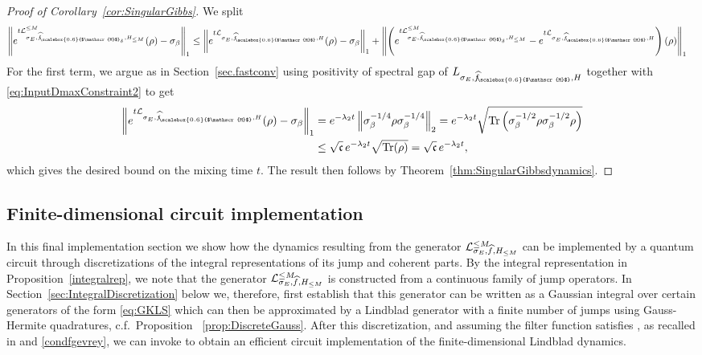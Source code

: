 \documentclass[11pt]{amsart}
\newcommand{\1}{\mathbbm{1}}
\newcommand{\Tr}{\operatorname{Tr}}
\newcommand{\cL}{\mathcal{L}}
\newcommand{\hatfM}{\widehat{f}_{\!\scalebox{0.6}{$\mathscr{M}$}}
}
\newcommand{\hatfMdelta}{\widehat{f}_{\!\scalebox{0.6}{$\mathscr{M}$}_\delta}}
\theoremstyle{plain}
\theoremstyle{definition}
\theoremstyle{remark}
\numberwithin{equation}{section}
\begin{document}
\begin{proof}[Proof of Corollary~\ref{cor:SingularGibbs}]
We split
\begin{align}
\label{eq:MajorTriangle2}
   \left\|e^{t\cL^{\le M}_{\sigma_E,\hatfMdelta,H_{\le M}}}(\rho) - \sigma_\beta\right\|_1  &\le \left\|e^{t\cL_{\sigma_E,\hatfM,H}}(\rho) - \sigma_\beta\right\|_1+\left\|\left(e^{t\cL^{\le M}_{\sigma_E,\hatfMdelta,H_{\le M}}} -e^{t\cL_{\sigma_E,\hatfM,H}}\right)(\rho)\right\|_1  
\end{align}
For the first term, we argue as in Section~\ref{sec.fastconv} using positivity of spectral gap of $L_{\sigma_E,\hatfM,H}$ together with \eqref{eq:InputDmaxConstraint2} to get
\begin{align*} \left\|e^{t\cL_{\sigma_E,\hatfM,H}}(\rho)- \sigma_\beta\right\|_1 &= e^{-\lambda_2 t} \left\|\sigma_\beta^{-1/4}\rho\sigma^{-1/4}_\beta\right\|_2 = e^{-\lambda_2 t} \sqrt{\Tr\left(\sigma^{-1/2}_\beta\rho\sigma^{-1/2}_\beta\rho\right)} \\&\le \sqrt{\mathfrak{c}}\,e^{-\lambda_2 t} \sqrt{\Tr(\rho)}= \sqrt{\mathfrak{c}}\,e^{-\lambda_2 t},
\end{align*}
which gives the desired bound on the mixing time $t.$ The result then follows by Theorem~\ref{thm:SingularGibbsdynamics}.
\end{proof}













\subsection{Finite-dimensional circuit implementation}
\label{sec:FullFiniteDimPipeline}


\noindent In this final implementation section we show how the dynamics resulting from the generator $\cL_{\smash{\sigma_E,\widehat{f},H_{\le M}}}^{\le M}$ can be implemented by a quantum circuit through discretizations of the integral representations of its jump and coherent parts. By the integral representation in Proposition~\ref{integralrep}, we note that the generator $\cL_{\smash{\sigma_E,\widehat{f},H_{\le M}}}^{\le M}$ is constructed from a continuous family of jump operators. In Section~\ref{sec:IntegralDiscretization} below we, therefore, first establish that this generator can be written as a Gaussian integral over certain generators of the form \eqref{eq:GKLS} which can then be approximated by a Lindblad generator with a finite number of jumps using Gauss-Hermite quadratures, c.f.~Proposition ~\ref{prop:DiscreteGauss}. After this discretization, and assuming the filter function satisfies \cite[Assumption 13]{ding2025efficient}, as recalled in  and \ref{condfgevrey}, we can invoke \cite[Theorem 18]{ding2025efficient} to obtain an efficient circuit implementation of the finite-dimensional Lindblad dynamics.
\end{document}
